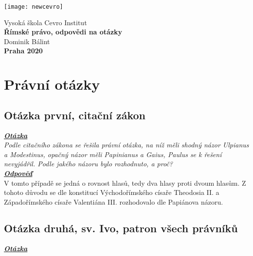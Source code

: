 \documentclass{article}
\begin{document}
  \thispagestyle{empty}
  \begin{center}
  \texttt{[image: newcevro]} \\
  \end{center}
  \vspace{15mm}
  \begin{center}
  {\Large Vysoká škola Cevro Institut} \\
  \vspace{15mm}
  {\Large \textbf{Římské právo, odpovědi na otázky}} \\
  \vspace{15mm}
  {\Large Dominik Bálint} \\
  \vspace{49mm}
  {\Large \textbf{Praha 2020}} \\
  \end{center}

\newpage
  \thispagestyle{Contents}
  \tableofcontents
  
\newpage
\section{Právní otázky}  

\subsection{Otázka první, citační zákon}
\textbf{\textit{\underline{Otázka}}}\\

\indent\textit{Podle citačního zákona se řešila právní otázka, na níž měli shodný názor Ulpianus a Modestinus, opačný názor měli Papinianus a Gaius, Paulus se k řešení nevyjádřil. Podle jakého názoru bylo rozhodnuto, a proč?}\\

\noindent\textbf{\textit{\underline{Odpověď}}}\\

\indent V tomto případě se jedná o rovnost hlasů, tedy dva hlasy proti dvoum hlasům. Z tohoto důvodu se dle konstitucí Východořímského císaře Theodosia II. a Západořímského císaře Valentiána III. rozhodovalo dle Papiánova názoru.

\subsection{Otázka druhá, sv. Ivo, patron všech právníků}
\textbf{\textit{\underline{Otázka}}}\\
\end{document}
